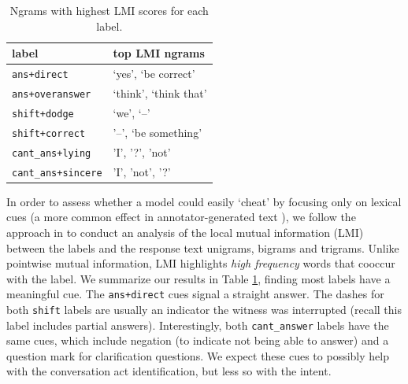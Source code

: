 \begin{table}[t]
\centering
\small
\begin{tabular}{ll}
\toprule
label  & top LMI ngrams\\ 
\midrule
\texttt{ans+direct}  &`yes', `be correct'  \\
\texttt{ans+overanswer} &`think', `think that' \\
\texttt{shift+dodge} &`we', `--'\\
\texttt{shift+correct} &'--', `be something'\\
\texttt{cant\_ans+lying} &'I', '?', 'not'\\
\texttt{cant\_ans+sincere} &'I', 'not', '?'\\
\bottomrule
\end{tabular}
\caption{Ngrams with highest LMI scores for each label.}
\label{tab:subj_lmi}
\end{table}

In order to assess whether a model could easily `cheat' by focusing only on lexical cues (a more common effect in annotator-generated text \cite{}), we follow the approach in \newcite{} to conduct an analysis of the local mutual information (LMI) between the labels and the response text unigrams, bigrams and trigrams. Unlike pointwise mutual information, LMI highlights \emph{high frequency} words that cooccur with the label. We summarize our results in Table \ref{tab:subj_lmi}, finding most labels have a meaningful cue. The \texttt{ans+direct} cues signal a straight answer. The dashes for both \texttt{shift} labels are usually an indicator the witness was interrupted (recall this label includes partial answers). Interestingly, both \texttt{cant\_answer} labels have the same cues, which include negation (to indicate not being able to answer) and a question mark for clarification questions. We expect these cues to possibly help with the conversation act identification, but less so with the intent.

